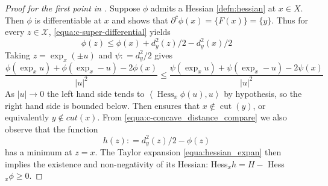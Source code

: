 \begin{proof}[Proof for the first point in ]
	Suppose \( \phi \) admits a Hessian \cref{defn:hessian} at \( x \in X \).
	Then \( \phi \) is differentiable at \( x \) and
	 shows that \( \partial ^ { c } \phi ( x ) = \{ F ( x ) \} = \{ y \} \).
	Thus for every \( z \in \mathcal { X } \), \cref{equa:c-super-differential} yields
	\begin{equation}
		\label{equa:c-concave_distance_compare}
		\phi ( z ) \leq \phi ( x ) + d _ { y } ^ { 2 } ( z ) / 2 - d _ { y } ^ { 2 } ( x ) / 2
	\end{equation}
	Taking \( z = \exp _ { x } ( \pm u ) \) and \( \psi : = d _ { y } ^ { 2 } / 2 \) gives
	\[ \frac { \phi \left( \exp _ { x } u \right) + \phi \left( \exp _ { x } - u \right) - 2 \phi ( x ) } { | u | ^ { 2 } } \leq \frac { \psi \left( \exp _ { x } u \right) + \psi \left( \exp _ { x } - u \right) - 2 \psi ( x ) } { | u | ^ { 2 } } \]
	As \( | u | \rightarrow 0 \) the left hand side tends to \( \left\langle \operatorname { Hess } _ { x } \phi ( u ) , u \right\rangle \) by hypothesis, so the right hand side is bounded below.
	Then  ensures that
	\( x \notin \operatorname { cut } ( y ) \), or equivalently \( y \notin c u t ( x ) \).
	From \cref{equa:c-concave_distance_compare} we also observe that the function
	\begin{equation}
		\label{proof:h_definition}
		h ( z ) : = d _ { y } ^ { 2 } ( z ) / 2 - \phi ( z )
	\end{equation}
	has a minimum at \( z = x \). The Taylor expansion \cref{equa:hessian_expan} then implies the
	existence and non-negativity of its Hessian: Hess\(_{ x } h = H - \) Hess\(_ { x } \phi \geq 0\).
\end{proof}


